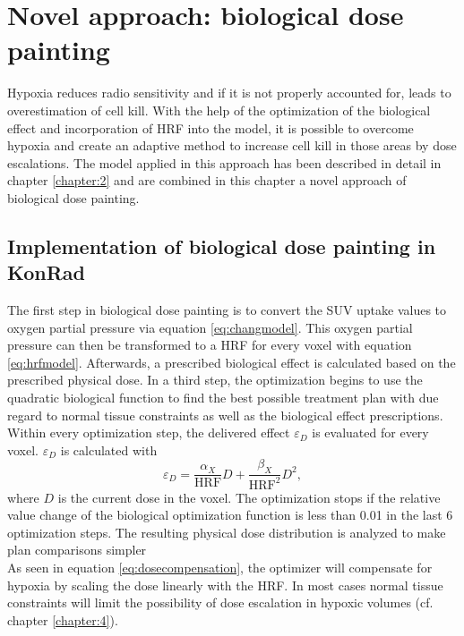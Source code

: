 \section{Novel approach: biological dose painting}
Hypoxia reduces radio sensitivity and if it is not properly accounted for, leads to overestimation of cell kill. With the help of the optimization of the biological effect and incorporation of HRF into the model, it is possible to overcome hypoxia and create an adaptive method to increase cell kill in those areas by dose escalations. The model applied in this approach has been described in detail in chapter \ref{chapter:2} and are combined in this chapter a novel approach of biological dose painting.
\subsection{Implementation of biological dose painting in KonRad}
The first step in biological dose painting is to convert the SUV uptake values to oxygen partial pressure via equation \ref{eq:changmodel}. This oxygen partial pressure can then be transformed to a HRF for every voxel with equation \ref{eq:hrfmodel}. Afterwards, a prescribed biological effect is calculated based on the prescribed physical dose. In a third step, the optimization begins to use the quadratic biological function to find the best possible treatment plan with due regard to normal tissue constraints as well as the biological effect prescriptions. Within every optimization step, the delivered effect $\varepsilon_D$  is evaluated for every voxel. $\varepsilon_D$ is calculated with
\begin{equation}
\varepsilon_D = \frac{\alpha_X}{\mathrm{HRF}}D+\frac{\beta_X}{\mathrm{HRF}^2}D^2,
\end{equation}
where $D$ is the current dose in the voxel. The optimization stops if the relative value change of the biological optimization function is less than 0.01 in the last 6 optimization steps. The resulting physical dose distribution is analyzed to make plan comparisons simpler\\As seen in equation \ref{eq:dosecompensation}, the optimizer will compensate for hypoxia by scaling the dose linearly with the HRF. In most cases normal tissue constraints will limit the possibility of dose escalation in hypoxic volumes (cf. chapter \ref{chapter:4}).

